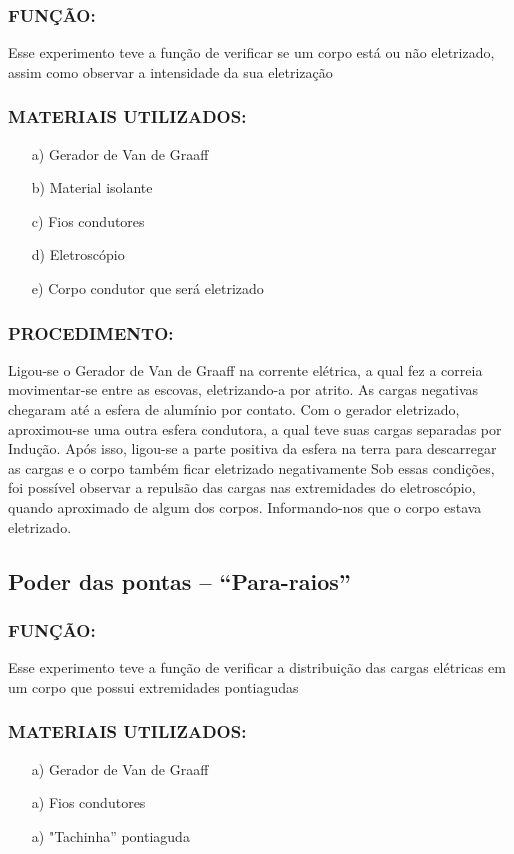 \subsubsection{FUNÇÃO:}

\noindent Esse experimento teve a função de verificar se um corpo está ou não eletrizado, assim como 
observar a intensidade da sua eletrização

\subsubsection{MATERIAIS UTILIZADOS:} 
\begin{itemize}
    \item[a)] Gerador de Van de Graaff
    \item[b)] Material isolante
    \item[c)] Fios condutores
    \item[d)] Eletroscópio
    \item[e)] Corpo condutor que será eletrizado
\end{itemize}

\subsubsection{PROCEDIMENTO:} 
Ligou-se o Gerador de Van de Graaff na corrente elétrica, a qual fez a correia movimentar-se entre 
as escovas, eletrizando-a por atrito. As cargas negativas chegaram até a esfera de alumínio por 
contato.
\noindent Com o gerador eletrizado, aproximou-se uma outra esfera condutora, a qual teve suas cargas 
separadas por Indução. Após isso, ligou-se a parte positiva da esfera na terra para descarregar as 
cargas e o corpo também ficar eletrizado negativamente
Sob essas condições, foi possível observar a repulsão das cargas nas extremidades do
eletroscópio, quando aproximado de algum dos corpos. Informando-nos que o corpo estava 
eletrizado.

\subsection{Poder das pontas – “Para-raios”}

\subsubsection{FUNÇÃO:}
Esse experimento teve a função de verificar a distribuição das cargas elétricas em um corpo que 
possui extremidades pontiagudas
\subsubsection{MATERIAIS UTILIZADOS: }
\begin{itemize}
    \item[a)] Gerador de Van de Graaff
    \item[a)] Fios condutores
    \item[a)] "Tachinha” pontiaguda
\end{itemize}

